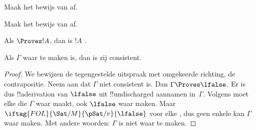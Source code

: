 \documentclass[openany]{memoir}
\begin{document}
\begin{prob}
Maak het bewijs van  af.
\end{prob}
\tagendprob

\begin{prob}
Maak het bewijs van  af.
\end{prob}
\tagendprob

\begin{cor}
Als $\Proves !A$, dan is $!A$
.
\end{cor}

\begin{cor}
Als $\Gamma$ waar te maken is, dan is zij consistent.
\end{cor}

\begin{proof}
We bewijzen de tegengestelde uitspraak met omgekeerde richting, de
contrapositie. Neem aan dat $\Gamma$ niet consistent is. Dan
$\Gamma \Proves \lfalse$. Er is dus !!a{derivation} van $\lfalse$ uit
!!{undischarged} aannamen in~$\Gamma$. Volgens
 moet elke
die $\Gamma$ waar maakt, ook $\lfalse$ waar maken. Maar
$\iftag{FOL}{\Sat/{M}}{\pSat/{v}}{\lfalse}$ voor elke
,
dus geen enkele  kan
$\Gamma$ waar maken. Met andere woorden: $\Gamma$ is niet waar te
maken.
\end{proof}
\endgroup

\begingroup
\def\olfilename{OLP-0096}
\def\olfilepath{content/first-order-logic/natural-deduction/}
\hypertarget{unit-OLP-0096}{}




\end{document}
